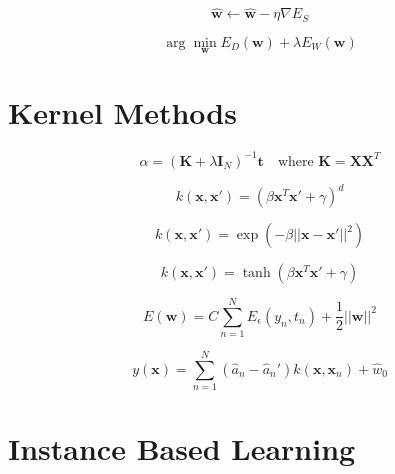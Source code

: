 \documentclass{article}
\begin{document}
\begin{equation}
    \hat{\mathbf{w}} \leftarrow \hat{\mathbf{w}} - \eta \nabla E_S
\end{equation}

\begin{equation}
    \arg\min_{\mathbf{w}} E_D(\mathbf{w}) + \lambda E_W(\mathbf{w})
\end{equation}


\section{Kernel Methods}

\begin{equation}
    \alpha = (\mathbf{K} + \lambda \mathbf{I}_N)^{-1} \mathbf{t} \quad \text{where } \mathbf{K} = \mathbf{X} \mathbf{X}^T
\end{equation}

\begin{equation}
    k(\mathbf{x}, \mathbf{x}') = (\beta \mathbf{x}^T \mathbf{x}' + \gamma)^d
\end{equation}

\begin{equation}
    k(\mathbf{x}, \mathbf{x}') = \exp(-\beta ||\mathbf{x} - \mathbf{x}'||^2)
\end{equation}

\begin{equation}
    k(\mathbf{x}, \mathbf{x}') = \tanh(\beta \mathbf{x}^T \mathbf{x}' + \gamma)
\end{equation}

\begin{equation}
    E(\mathbf{w}) = C \sum_{n=1}^N E_\epsilon(y_n, t_n) + \frac{1}{2} ||\mathbf{w}||^2
\end{equation}

\begin{equation}
    y(\mathbf{x}) = \sum_{n=1}^N (\hat{a}_n - \hat{a}_n') k(\mathbf{x}, \mathbf{x}_n) + \hat{w}_0
\end{equation}


\section{Instance Based Learning}
\end{document}

